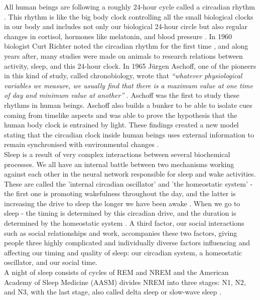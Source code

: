 \documentclass[12pt]{article} %
\begin{document}
All human beings are following a roughly 24-hour cycle called a circadian rhythm \cite{bewellSleep}. This rhythm is like the big body clock controlling all the small biological clocks in our body and includes not only our biological 24-hour circle but also regular changes in cortisol, hormones like melatonin, and blood pressure \cite{bewellSleep}. In 1960 biologist Curt Richter noted the circadian rhythm for the first time \cite{circadian}, and along years after, many studies were made on animals to research relations between activity, sleep, and this 24-hour clock. In 1965 Jürgen Aschoff, one of the pioneers in this kind of study, called chronobiology, wrote that \textit{``whatever physiological variables we measure, we usually find that there is a maximum value at one time of day and minimum value at another''} \cite{rhythm}. Aschoff was the first to study these rhythms in human beings. Aschoff also builds a bunker to be able to isolate cues coming from timelike aspects \cite{rhythm2} and was able to prove the hypothesis that the human body clock is entrained by light. These findings created a new model stating that the circadian clock inside human beings uses external information to remain synchronised with environmental changes \cite{bewellSleep}. \\

Sleep is a result of very complex interactions between several biochemical processes. We all have an internal battle between two mechanisms working against each other in the neural network responsible for sleep and wake activities. These are called the 'internal circadian oscillator' and 'the homeostatic system' - the first one is promoting wakefulness throughout the day, and the latter is increasing the drive to sleep the longer we have been awake \cite{promise}. When we go to sleep - the timing is determined by this circadian drive, and the duration is determined by the homeostatic system \cite{life}. A third factor, our social interactions such as social relationships and work, accompanies these two factors, giving people three highly complicated and individually diverse factors influencing and affecting our timing and quality of sleep: our circadian system, a homeostatic oscillator, and our social time.\\

A night of sleep consists of cycles of REM and NREM and the American Academy of Sleep Medicine (AASM) \cite{aasm} divides NREM into three stages: N1, N2, and N3, with the last stage, also called delta sleep or slow-wave sleep \cite{visual}. 
\end{document}
